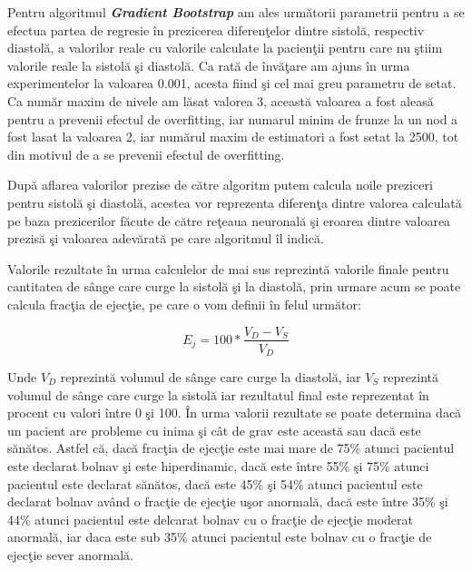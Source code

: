 Pentru algoritmul \textbf{\textit{Gradient Bootstrap}} am ales urm\u{a}torii parametrii pentru a se efectua partea de regresie \^{i}n prezicerea diferen\c{t}elor dintre sistol\u{a}, respectiv diastol\u{a}, a valorilor reale cu valorile calculate la pacien\c{t}ii pentru care nu \c{s}tiim valorile reale la sistol\u{a} \c{s}i diastol\u{a}. Ca rat\u{a} de \^{i}nv\u{a}\c{t}are am ajuns \^{i}n urma experimentelor la valoarea 0.001, acesta fiind \c{s}i cel mai greu parametru de setat. Ca num\u{a}r maxim de nivele am l\u{a}sat valorea 3, aceast\u{a} valoarea a fost aleas\u{a} pentru a prevenii efectul de overfitting, iar numarul minim de frunze la un nod a fost lasat la valoarea 2, iar num\u{a}rul maxim de estimatori a fost setat la 2500, tot din motivul de a se prevenii efectul de overfitting.

\par

Dup\u{a} aflarea valorilor prezise de c\u{a}tre algoritm putem calcula noile preziceri pentru sistol\u{a} \c{s}i diastol\u{a}, acestea vor reprezenta diferen\c{t}a dintre valorea calculat\u{a} pe baza prezicerilor f\u{a}cute de c\u{a}tre re\c{t}eaua neuronal\u{a} \c{s}i eroarea dintre valoarea prezis\u{a} \c{s}i valoarea adev\u{a}rat\u{a} pe care algoritmul \^{i}l indic\u{a}. 

\par

Valorile rezultate \^{i}n urma calculelor de mai sus reprezint\u{a} valorile finale pentru cantitatea de s\^{a}nge care curge la sistol\u{a} \c{s}i la diastol\u{a}, prin urmare acum se poate calcula frac\c{t}ia de ejec\c{t}ie, pe care o vom definii \^{i}n felul urm\u{a}tor:

$$ E_j = 100 * \frac{V_D - V_S}{V_D} $$

Unde $V_D$ reprezint\u{a} volumul de s\^{a}nge care curge la diastol\u{a}, iar $V_S$ reprezint\u{a} volumul de s\^{a}nge care curge la sistol\u{a} iar rezultatul final este reprezentat \^{i}n procent cu valori \^{i}ntre 0 \c{s}i 100. \^{I}n urma valorii rezultate se poate determina dac\u{a} un pacient are probleme cu inima \c{s}i c\^{a}t de grav este aceast\u{a} sau dac\u{a} este s\u{a}n\u{a}tos. Astfel c\u{a}, dac\u{a} frac\c{t}ia de ejec\c{t}ie este mai mare de 75\% atunci pacientul este declarat bolnav \c{s}i este hiperdinamic, dac\u{a} este \^{i}ntre 55\% \c{s}i 75\% atunci pacientul este declarat s\u{a}n\u{a}tos, dac\u{a} este 45\% \c{s}i 54\% atunci pacientul este declarat bolnav av\^{a}nd o frac\c{t}ie de ejec\c{t}ie u\c{s}or anormal\u{a}, dac\u{a} este \^{i}ntre 35\% \c{s}i 44\% atunci pacientul este delcarat bolnav cu o frac\c{t}ie de ejec\c{t}ie moderat anormal\u{a}, iar daca este sub 35\% atunci pacientul este bolnav cu o frac\c{t}ie de ejec\c{t}ie sever anormal\u{a}.

